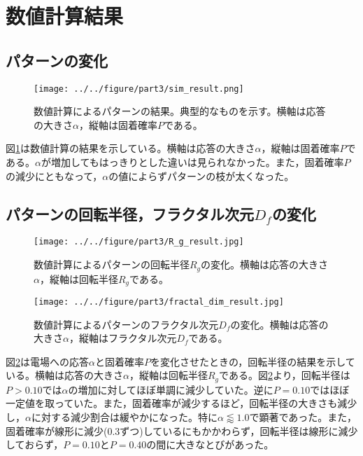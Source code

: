 \documentclass[autodetect-engine,dvi=dvipdfmx,a4paper,ja=standard,oneside,openany]{bxjsbook}
\begin{document}
\section{数値計算結果}
\subsection{パターンの変化}

\begin{figure}[htbp]
  \centering
  \texttt{[image: ../../figure/part3/sim\_result.png]}
  \caption{数値計算によるパターンの結果。典型的なものを示す。横軸は応答の大きさ$\alpha$，縦軸は固着確率$P$である。}
  \label{fig:sim_result}
\end{figure}

図\ref{fig:sim_result}は数値計算の結果を示している。横軸は応答の大きさ$\alpha$，縦軸は固着確率$P$である。$\alpha$が増加してもはっきりとした違いは見られなかった。また，固着確率$P$の減少にともなって，$\alpha$の値によらずパターンの枝が太くなった。
\subsection{パターンの回転半径，フラクタル次元$D_f$の変化}

\begin{figure}[htbp]
  \centering
  \texttt{[image: ../../figure/part3/R\_g\_result.jpg]}
  \caption{数値計算によるパターンの回転半径$R_g$の変化。横軸は応答の大きさ$\alpha$，縦軸は回転半径$R_g$である。}
  \label{fig:R_g_result}
\end{figure}

\begin{figure}
  \centering
  \texttt{[image: ../../figure/part3/fractal\_dim\_result.jpg]}
  \caption{数値計算によるパターンのフラクタル次元$D_f$の変化。横軸は応答の大きさ$\alpha$，縦軸はフラクタル次元$D_f$である。}
  \label{fig:fractal_dim_result}
\end{figure}

図\ref{fig:R_g_result}は電場への応答$\alpha$と固着確率$P$を変化させたときの，回転半径の結果を示している。横軸は応答の大きさ$\alpha$，縦軸は回転半径$R_g$である。図\ref{fig:R_g_result}より，回転半径は$P>0.10$では$\alpha$の増加に対してほぼ単調に減少していた。逆に$P=0.10$ではほぼ一定値を取っていた。また，固着確率が減少するほど，回転半径の大きさも減少し，$\alpha$に対する減少割合は緩やかになった。特に$\alpha\lessapprox1.0$で顕著であった。また，固着確率が線形に減少(0.3ずつ)しているにもかかわらず，回転半径は線形に減少しておらず，$P=0.10$と$P=0.40$の間に大きなとびがあった。
\end{document}
